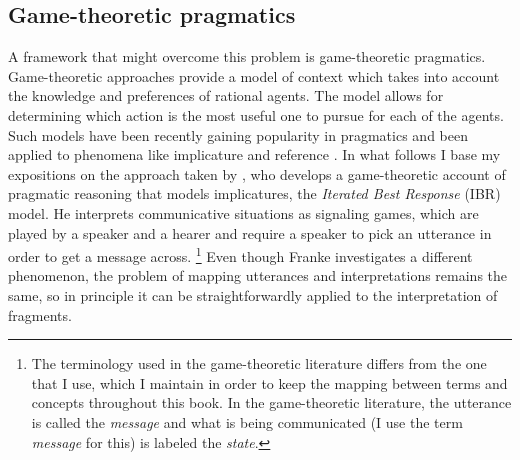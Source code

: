 \subsection{Game-theoretic pragmatics}
\largerpage
{}A framework that might overcome this problem is game-theoretic pragmatics. Game-theoretic approaches provide a model of context which takes into account the knowledge and preferences of rational agents. The model allows for determining which action is the most useful one to pursue for each of the agents. Such models have been recently gaining popularity in pragmatics and been applied to phenomena like implicature \citep{vanrooy2004, benz.vanrooij2007, franke2009, jager2012, goodman.stuhlmuller2013, gotzner.benz2018} and reference \citep{frank.goodman2012, rohde.etal2012, sikos.etal2019}. In what follows I base my expositions on the approach taken by \citet{franke2009}, who develops a game-theoretic account of pragmatic reasoning that models implicatures, the \textit{Iterated Best Response} (IBR) model. He interprets communicative situations as signaling games, which are played by a speaker and a hearer and require a speaker to pick an utterance in order to get a message across.%
%
\footnote{The terminology used in the game-theoretic literature differs from the one that I use, which I maintain in order to keep the mapping between terms and concepts throughout this book. In the game-theoretic literature, the utterance is called the \textit{message} and what is being communicated (I use the term \emph{message} for this) is labeled the \textit{state}.}\afterfn%
%
Even though Franke investigates a different phenomenon, the problem of mapping utterances and interpretations remains the same, so in principle it can be straightforwardly applied to the interpretation of fragments.


